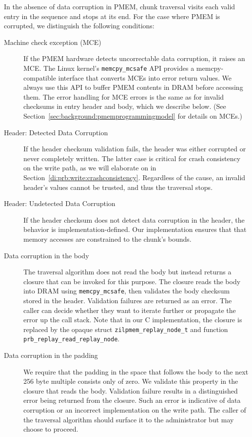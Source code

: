 \documentclass[12pt,a4paper,twoside]{book}
\begin{document}
{In the absence of data corruption in PMEM, chunk traversal visits each valid entry in the sequence and stops at its end.
For the case where PMEM is corrupted, we distinguish the following conditions:
\begin{description}
    \item[Machine check exception (MCE)] If the PMEM hardware detects uncorrecta\-ble data corruption, it raises an MCE.
        The Linux kernel's \lstinline{memcpy_mcsafe} API provides a memcpy-compatible interface that converts MCEs into error return values.
        We always use this API to buffer PMEM contents in DRAM before accessing them.
        The error handling for MCE errors is the same as for invalid checksums in entry header and body, which we describe below.
        (See Section~\ref{sec:background:pmemprogrammingmodel} for details on MCEs.)
    \item[Header: Detected Data Corruption]
        If the header checksum validation fails, the header was either corrupted or never completely written.
        The latter case is critical for crash consistency on the write path, as we will elaborate on in Section~\ref{di:prb:write:crashconsistency}.
        Regardless of the cause, an invalid header's values cannot be trusted, and thus the traversal stops.
    \item[Header: Undetected Data Corruption]
        If the header checksum does not detect data corruption in the header, the behavior is implementation-defined.
        Our implementation ensures that that memory accesses are constrained to the chunk's bounds.
    \item[Data corruption in the body]
        The traversal algorithm does not read the body but instead returns a closure that can be invoked for this purpose.
        The closure reads the body into DRAM using \lstinline{memcpy_mcsafe}, then validates the body checksum stored in the header.
        Validation failures are returned as an error.
        The caller can decide whether they want to iterate further or propagate the error up the call stack.
        Note that in our C implementation, the closure is replaced by the opaque struct \lstinline{zilpmem_replay_node_t} and function \lstinline{prb_replay_read_replay_node}.
    \item[Data corruption in the padding]
        We require that the padding in the space that follows the body to the next 256 byte multiple consists only of zero.
        We validate this property in the closure that reads the body.
        Validation failure results in a distinguished error being returned from the closure.
        Such an error is indicative of data corruption or an incorrect implementation on the write path.
        The caller of the traversal algorithm should surface it to the administrator but may choose to proceed.
\end{description}

}
\end{document}
